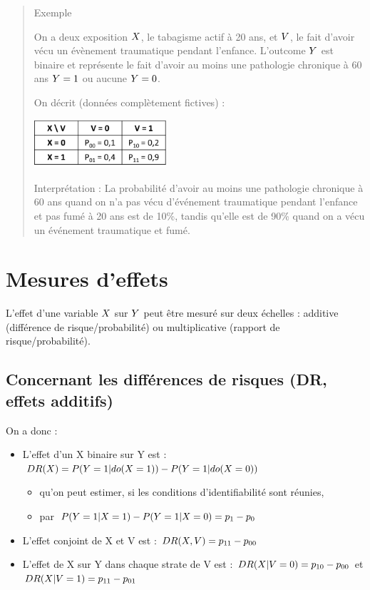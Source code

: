 \documentclass[
]{book}
\providecommand{\tightlist}{%
  \setlength{\itemsep}{0pt}\setlength{\parskip}{0pt}}
\begin{document}
\begin{quote}
Exemple

On a deux exposition \(\small X\), le tabagisme actif à 20 ans, et \(\small V\), le fait d'avoir vécu un évènement traumatique pendant l'enfance. L'outcome \(\small Y\) est binaire et représente le fait d'avoir au moins une pathologie chronique à 60 ans \(\small Y=1\) ou aucune \(\small Y=0\).

On décrit (données complètement fictives) :

\includegraphics[width=0.4\textwidth,height=\textheight]{img/Image1.png}

Interprétation : La probabilité d'avoir au moins une pathologie chronique à 60 ans quand on n'a pas vécu d'événement traumatique pendant l'enfance et pas fumé à 20 ans est de 10\%, tandis qu'elle est de 90\% quand on a vécu un événement traumatique et fumé.
\end{quote}

\hypertarget{mesures-deffets}{%
\section{Mesures d'effets}\label{mesures-deffets}}

L'effet d'une variable \(\small X\) sur \(\small Y\) peut être mesuré sur deux échelles : additive (différence de risque/probabilité) ou multiplicative (rapport de risque/probabilité).

\hypertarget{concernant-les-diffuxe9rences-de-risques-dr-effets-additifs}{%
\subsection*{Concernant les différences de risques (DR, effets additifs)}\label{concernant-les-diffuxe9rences-de-risques-dr-effets-additifs}}

On a donc :

\begin{itemize}
\tightlist
\item
  L'effet d'un X binaire sur Y est : \(\small DR(X) = P(Y = 1|do(X = 1)) - P(Y = 1|do(X = 0))\)

  \begin{itemize}
  \tightlist
  \item
    qu'on peut estimer, si les conditions d'identifiabilité sont réunies,
  \item
    par \(\small P(Y = 1|X = 1) - P(Y = 1|X = 0) = p_1-p_0\)
  \end{itemize}
\item
  L'effet conjoint de X et V est : \(\small DR(X,V) = p_{11}-p_{00}\)
\item
  L'effet de X sur Y dans chaque strate de V est : \(\small DR(X|V=0) = p_{10}-p_{00}\) et \(\small DR(X|V=1) = p_{11}-p_{01}\)
\end{itemize}
\end{document}
